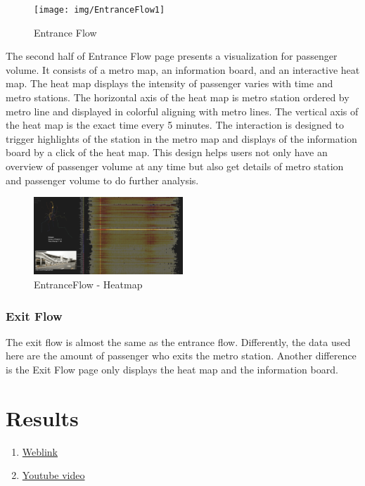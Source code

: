 \documentclass{proc}
\begin{document}
\begin{figure}[t]
	\centering
	\texttt{[image: img/EntranceFlow1]}
	\caption{Entrance Flow}
	\label{fig:curve}
\end{figure}

The second half of Entrance Flow page presents a visualization for passenger volume. It consists of a metro map, an information board, and an interactive heat map. The heat map displays the intensity of passenger varies with time and metro stations. The horizontal axis of the heat map is metro station ordered by metro line and displayed in colorful aligning with metro lines. The vertical axis of the heat map is the exact time every 5 minutes. The interaction is designed to trigger highlights of the station in the metro map and displays of the information board by a click of the heat map. This design helps users not only have an overview of passenger volume at any time but also get details of metro station and passenger volume to do further analysis. 

\begin{figure}[t]
	\centering
	\includegraphics[width=0.5\textwidth]{img/EntranceFlow2}
	\caption{EntranceFlow - Heatmap}
	\label{fig:curve}
\end{figure}

\subsubsection{Exit Flow}
The exit flow is almost the same as the entrance flow. Differently, the data used here are the amount of passenger who exits the metro station. Another difference is the Exit Flow page only displays the heat map and the information board.



\section{Results}
\begin{enumerate}
\item \href{https://yutinghan.github.io/gradfinal/}{Weblink}
\item \href{https://www.youtube.com/watch?v=0AUQpKVXM7k&app=desktop}{Youtube video}
\end{enumerate}
\end{document}
